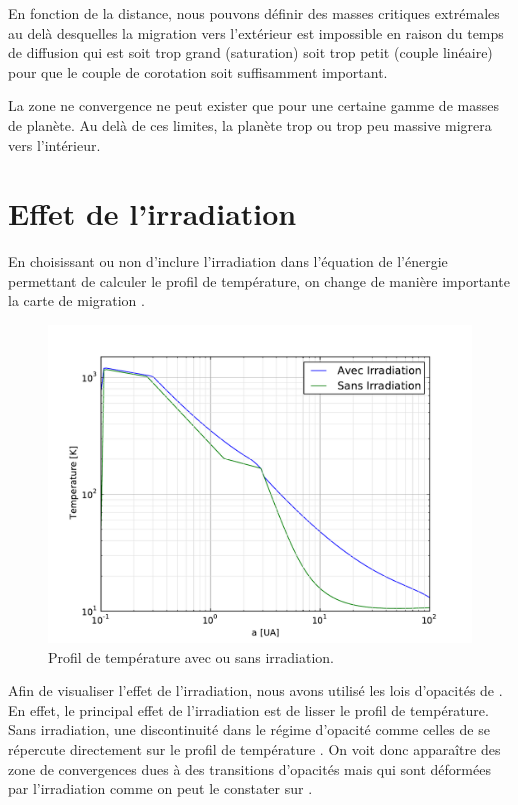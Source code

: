 En fonction de la distance, nous pouvons définir des masses critiques extrémales au delà desquelles la migration vers
l'extérieur est impossible en raison du temps de diffusion qui est soit trop grand (saturation) soit trop petit (couple
linéaire) pour que le couple de corotation soit suffisamment important.

La zone ne convergence ne peut exister que pour une certaine gamme de masses de planète. Au delà de ces limites, la planète trop ou trop peu massive migrera vers l'intérieur.

\section{Effet de l'irradiation}
En choisissant ou non d'inclure l'irradiation dans l'équation de l'énergie permettant de calculer le profil de température, on
change de manière importante la carte de migration \citep{bitsch2013stellar}. 


\begin{figure}[htbp]
\centering
\includegraphics[width=0.6\linewidth]{figure/migration_map/temperature_with_irradiation.pdf}
\caption{Profil de température avec ou sans irradiation. }\label{fig:temp_profile_irradiation}
\end{figure}


Afin de visualiser l'effet de l'irradiation, nous avons utilisé les lois d'opacités de \cite{bell1994FU}. En effet,
le principal effet de l'irradiation est de lisser le profil de température. Sans irradiation, une discontinuité dans le régime d'opacité comme celles de \cite{bell1994FU} se répercute directement sur le profil de température .
On voit donc apparaître des zone de convergences dues à des transitions d'opacités mais qui sont déformées par
l'irradiation comme on peut le constater sur .


